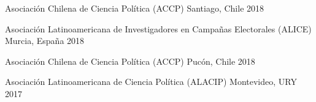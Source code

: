\begin{cvhonors}
\cvconf
{Asociación Chilena de Ciencia Política (ACCP)} 
{Santiago, Chile}
{2018}
\end{cvhonors}

\begin{cvhonors}
\cvconf
{Asociación Latinoamericana de Investigadores en Campañas Electorales (ALICE)} 
{Murcia, España}
{2018}
\end{cvhonors}

\begin{cvhonors}
\cvconf
{Asociación Chilena de Ciencia Política (ACCP)} 
{Pucón, Chile}
{2018}
\end{cvhonors}

\begin{cvhonors}
\cvconf
{Asociación Latinoamericana de Ciencia Política (ALACIP)} 
{Montevideo, URY}
{2017}
\end{cvhonors}








